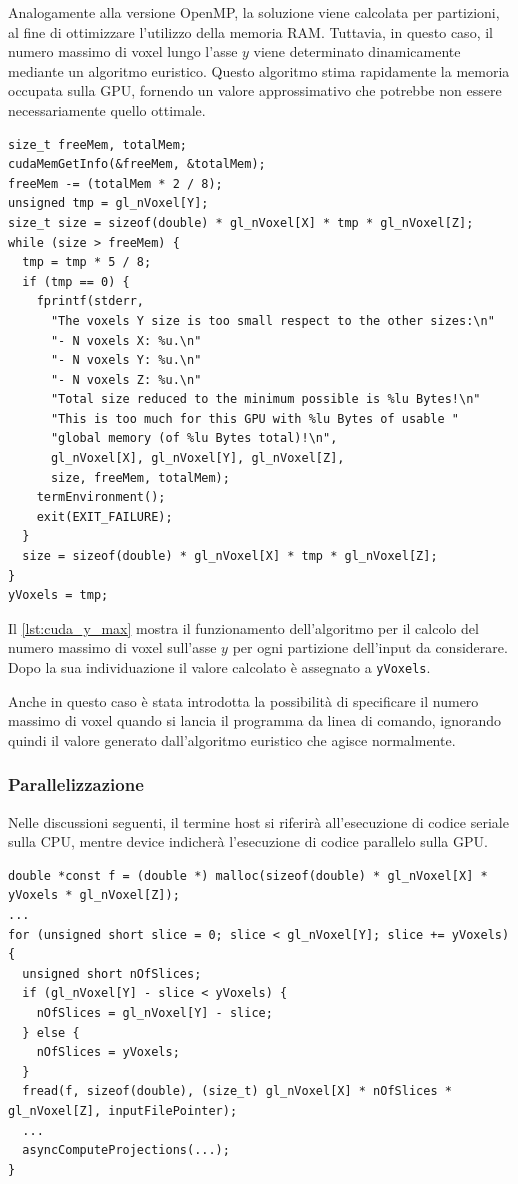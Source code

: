 \documentclass[12pt,a4paper]{report}
\begin{document}
Analogamente alla versione OpenMP, la soluzione viene calcolata per partizioni, al fine di ottimizzare l'utilizzo della memoria
RAM.
Tuttavia, in questo caso, il numero massimo di voxel lungo l'asse \(y\) viene determinato dinamicamente mediante un algoritmo
euristico.
Questo algoritmo stima rapidamente la memoria occupata sulla GPU, fornendo un valore approssimativo che potrebbe non essere
necessariamente quello ottimale.

\begin{lstlisting}[language=CStyle, caption={Codice CUDA-C per il calcolo del numero massimo di voxel sull'asse \(y\).}, label={lst:cuda_y_max}]
size_t freeMem, totalMem;
cudaMemGetInfo(&freeMem, &totalMem);
freeMem -= (totalMem * 2 / 8);
unsigned tmp = gl_nVoxel[Y];
size_t size = sizeof(double) * gl_nVoxel[X] * tmp * gl_nVoxel[Z];
while (size > freeMem) {
  tmp = tmp * 5 / 8;
  if (tmp == 0) {
    fprintf(stderr,
      "The voxels Y size is too small respect to the other sizes:\n"
      "- N voxels X: %u.\n"
      "- N voxels Y: %u.\n"
      "- N voxels Z: %u.\n"
      "Total size reduced to the minimum possible is %lu Bytes!\n"
      "This is too much for this GPU with %lu Bytes of usable "
      "global memory (of %lu Bytes total)!\n",
      gl_nVoxel[X], gl_nVoxel[Y], gl_nVoxel[Z],
      size, freeMem, totalMem);
    termEnvironment();
    exit(EXIT_FAILURE);
  }
  size = sizeof(double) * gl_nVoxel[X] * tmp * gl_nVoxel[Z];
}
yVoxels = tmp;
\end{lstlisting}

Il \autoref{lst:cuda_y_max} mostra il funzionamento dell'algoritmo per il calcolo del numero massimo di voxel sull'asse \(y\) per
ogni partizione dell'input da considerare.
Dopo la sua individuazione il valore calcolato è assegnato a \mbox{\lstinline{yVoxels}.}

Anche in questo caso è stata introdotta la possibilità di specificare il numero massimo di voxel quando si lancia il programma da
linea di comando, ignorando quindi il valore generato dall'algoritmo euristico che agisce normalmente.

\subsubsection{Parallelizzazione}

Nelle discussioni seguenti, il termine host si riferirà all'esecuzione di codice seriale sulla CPU, mentre device indicherà
l'esecuzione di codice parallelo sulla GPU.

\begin{lstlisting}[language=CStyle, caption={Codice CUDA-C per la lettura di \(f\).}, label={lst:cuda_vector_f_read}]
double *const f = (double *) malloc(sizeof(double) * gl_nVoxel[X] * yVoxels * gl_nVoxel[Z]);
...
for (unsigned short slice = 0; slice < gl_nVoxel[Y]; slice += yVoxels) {
  unsigned short nOfSlices;
  if (gl_nVoxel[Y] - slice < yVoxels) {
    nOfSlices = gl_nVoxel[Y] - slice;
  } else {
    nOfSlices = yVoxels;
  }
  fread(f, sizeof(double), (size_t) gl_nVoxel[X] * nOfSlices * gl_nVoxel[Z], inputFilePointer);
  ...
  asyncComputeProjections(...);
}
\end{lstlisting}
\end{document}
